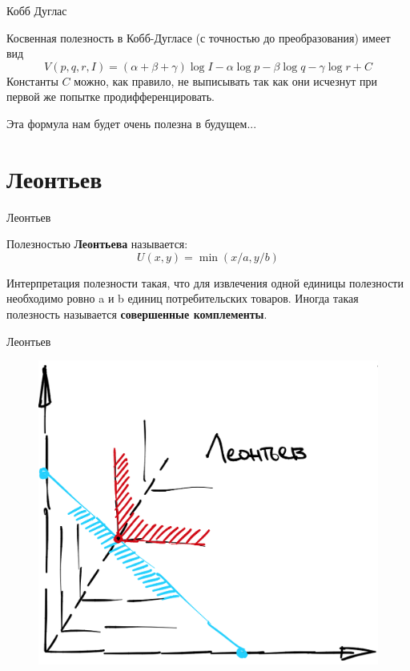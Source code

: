 \documentclass{beamer}
\begin{document}
\begin{frame}{Кобб Дуглас}

Косвенная полезность в Кобб-Дугласе (с точностью до преобразования) имеет вид
$$V(p,q,r,I) = (\alpha + \beta + \gamma) \log I - \alpha \log p - \beta \log q - \gamma \log r + C $$
Константы $C$ можно, как правило, не выписывать так как они исчезнут при первой же попытке продифференцировать.

Эта формула нам будет очень полезна в будущем...
\end{frame}

\section{Леонтьев}

\begin{frame}{Леонтьев}

\begin{definition}
Полезностью \textbf{Леонтьева} называется:
$$U(x, y) = \min(x/a, y/b)$$  
\end{definition}

Интерпретация полезности такая, что для извлечения одной единицы полезности  необходимо ровно a и b единиц потребительских товаров. Иногда такая полезность называется \textbf{совершенные комплементы}.

\end{frame}

\begin{frame}{Леонтьев}

\begin{figure}[hbt]
\centering
\includegraphics[width=.8 \textwidth]{leontiev}
\end{figure}

\end{frame}
\end{document}
